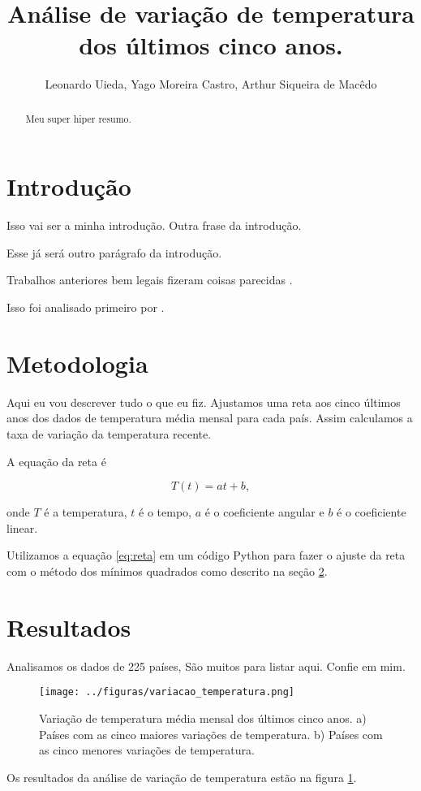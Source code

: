 \documentclass{article}
\begin{document}
\title{Análise de variação de temperatura dos últimos cinco anos.}
\author{Leonardo Uieda, Yago Moreira Castro, Arthur Siqueira de Macêdo}

\maketitle

\begin{abstract}
Meu super hiper resumo.

\end{abstract}

\section{Introdução}
\label{sec:intro}
Isso vai ser a minha introdução.
Outra frase da introdução.

Esse já será outro parágrafo da introdução.

Trabalhos anteriores bem legais fizeram coisas parecidas
\citep{Hansen2010}.

Isso foi analisado primeiro por \citet{Hansen2010}.

\section{Metodologia}
\label{sec:metodologia}
Aqui eu vou descrever tudo o que eu fiz.
Ajustamos uma reta aos cinco últimos anos dos dados
de temperatura média mensal para cada país.
Assim calculamos a taxa de variação da temperatura recente.

A equação da reta é

\begin{equation}
T(t) = a t + b,
\label{eq:reta}
\end{equation}

\noindent
onde $T$ é a temperatura, $t$ é o tempo, 
$a$ é o coeficiente angular e $b$ é o coeficiente linear.

Utilizamos a equação \ref{eq:reta} em um código Python para fazer 
o ajuste da reta com o método dos mínimos quadrados como descrito na seção \ref{sec:metodologia}.

\section{Resultados}
\label{sec:resultados}

Analisamos os dados de 225 países, São muitos para listar aqui. Confie em mim.

\begin{figure}[!htb] %
	\centering
	\texttt{[image: ../figuras/variacao\_temperatura.png]}
	\caption{
		Variação de temperatura média mensal dos últimos cinco anos. 
		a) Países com as cinco maiores variações de temperatura.
		b) Países com as cinco menores variações de temperatura.
	}
\label{fig:varia_temp}
\end{figure} 
Os resultados da análise de variação de temperatura estão na figura \ref{fig:varia_temp}.



\end{document}
